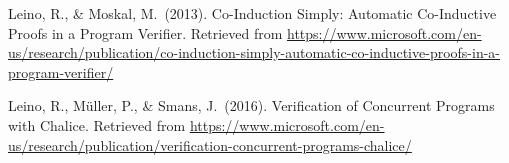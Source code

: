 \documentclass[12pt,twoside]{article}
\begin{document}
{\begin{thebibliography}{222}
Leino, R., \& Moskal, M.~(2013). Co-Induction Simply: Automatic Co-Inductive Proofs in a Program Verifier. Retrieved from \href{https://www.microsoft.com/en-us/research/publication/co-induction-simply-automatic-co-inductive-proofs-in-a-program-verifier/}{{\ttfamily https://\hspace{0pt}www.\hspace{0pt}microsoft.\hspace{0pt}com/\hspace{0pt}en-\hspace{0pt}us/\hspace{0pt}research/\hspace{0pt}publication/\hspace{0pt}co-\hspace{0pt}induction-\hspace{0pt}simply-\hspace{0pt}automatic-\hspace{0pt}co-\hspace{0pt}inductive-\hspace{0pt}proofs-\hspace{0pt}in-\hspace{0pt}a-\hspace{0pt}program-\hspace{0pt}verifier/\hspace{0pt}}}\label{leino_co-induction_2013}%

Leino, R., Müller, P., \& Smans, J.~(2016). Verification of Concurrent Programs with Chalice. Retrieved from \href{https://www.microsoft.com/en-us/research/publication/verification-concurrent-programs-chalice/}{{\ttfamily https://\hspace{0pt}www.\hspace{0pt}microsoft.\hspace{0pt}com/\hspace{0pt}en-\hspace{0pt}us/\hspace{0pt}research/\hspace{0pt}publication/\hspace{0pt}verification-\hspace{0pt}concurrent-\hspace{0pt}programs-\hspace{0pt}chalice/\hspace{0pt}}}\label{leino_verification_2016}%


\end{thebibliography}}
\end{document}
